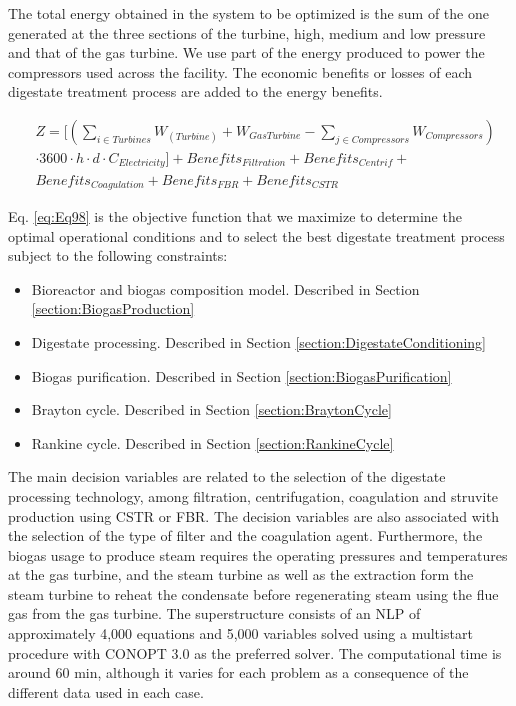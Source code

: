 \begin{refsection}[referencesCh2]
The total energy obtained in the system to be optimized is the sum of the one generated at the three sections of the turbine, high, medium and low pressure and that of the gas turbine. We use part of the energy produced to power the compressors used across the facility. The economic benefits or losses of each digestate treatment process are added to the energy benefits.

\begin{align}
	&Z = \Bigg[ \left( \sum\limits_{i \in Turbines} {W}_{\left( {Turbine} \right)}  + W_{Gas Turbine} - \sum\limits_{j \in Compressors} W_{Compressors}  \right) \label{eq:Eq98} \\ 
	& \cdot 3600\cdot h \cdot d \cdot {C_{Electricity}} \Bigg]+ Benefits_{Filtration} + {Benefits}_{Centrif} + \nonumber \\
	& {Benefits}_{Coagulation} + {Benefits}_{FBR} + {Benefits}_{CSTR} \nonumber
\end{align}

Eq. \ref{eq:Eq98} is the objective function that we maximize to determine the optimal operational conditions and to select the best digestate treatment process subject to the following constraints:

\begin{itemize}
	\item Bioreactor and biogas composition model. Described in Section \ref{section:BiogasProduction}
	\item Digestate processing. Described in Section \ref{section:DigestateConditioning}
	\item Biogas purification. Described in Section \ref{section:BiogasPurification}
	\item Brayton cycle. Described in Section \ref{section:BraytonCycle}
	\item Rankine cycle. Described in Section \ref{section:RankineCycle}
\end{itemize}

The main decision variables are related to the selection of the digestate processing technology, among filtration, centrifugation, coagulation and struvite production using CSTR or FBR. The decision variables are also associated with the selection of the type of filter and the coagulation agent. Furthermore, the biogas usage to produce steam requires the operating pressures and temperatures at the gas turbine, and the steam turbine as well as the extraction form the steam turbine to reheat the condensate before regenerating steam using the flue gas from the gas turbine. The superstructure consists of an NLP of approximately 4,000 equations and 5,000 variables solved using a multistart procedure with CONOPT 3.0 as the preferred solver. The computational time is around 60 min, although it varies for each problem as a consequence of the different data used in each case.


\end{refsection}
